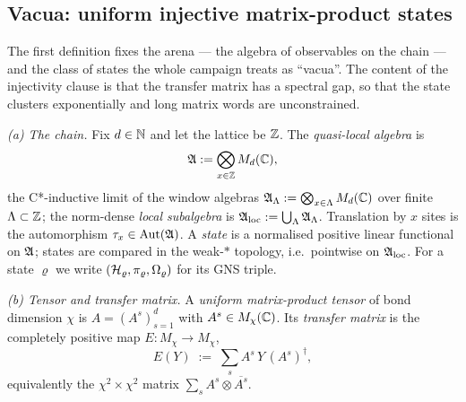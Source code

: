 \subsection{Vacua: uniform injective matrix-product states}

The first definition fixes the arena --- the algebra of observables on the
chain --- and the class of states the whole campaign treats as ``vacua''. The
content of the injectivity clause is that the transfer matrix has a spectral
gap, so that the state clusters exponentially and long matrix words are
unconstrained.

\begin{definition}
\label{def:injective-mps}
\emph{(a) The chain.} Fix $d \in \mathbb{N}$ and let the lattice be $\mathbb{Z}$. The
\emph{quasi-local algebra} is
\begin{equation}
  \mathfrak{A} := \bigotimes_{x \in \mathbb{Z}} M_{d}(\mathbb{C}),
\end{equation}
the C*-inductive limit of the window algebras
$\mathfrak{A}_{\Lambda} := \bigotimes_{x \in \Lambda} M_{d}(\mathbb{C})$ over finite
$\Lambda \subset \mathbb{Z}$; the norm-dense \emph{local subalgebra} is
$\mathfrak{A}_{\mathrm{loc}} := \bigcup_{\Lambda} \mathfrak{A}_{\Lambda}$. Translation by $x$ sites is the
automorphism $\tau_{x} \in \mathrm{Aut}(\mathfrak{A})$. A \emph{state} is a normalised
positive linear functional on $\mathfrak{A}$; states are compared in the weak-$*$
topology, i.e.\ pointwise on $\mathfrak{A}_{\mathrm{loc}}$. For a state $\varrho$ we write
$(\mathcal{H}_{\varrho}, \pi_{\varrho}, \Omega_{\varrho})$ for its GNS triple.

\emph{(b) Tensor and transfer matrix.} A \emph{uniform matrix-product tensor}
of bond dimension $\chi$ is $A = (A^{s})_{s=1}^{d}$ with
$A^{s} \in M_{\chi}(\mathbb{C})$. Its \emph{transfer matrix} is the completely
positive map $E : M_{\chi} \to M_{\chi}$,
\begin{equation}
  E(Y) \; := \; \sum_{s} A^{s} \, Y \, (A^{s})^{\dagger},
\end{equation}
equivalently the $\chi^{2} \times \chi^{2}$ matrix
$\sum_{s} A^{s} \otimes \overline{A^{s}}$.


\end{definition}
